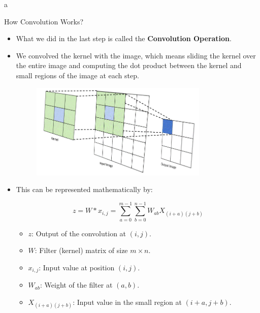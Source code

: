 a\documentclass[10pt]{beamer}
\theoremstyle{remark}
\theoremstyle{definition}
\begin{document}
\begin{frame}[allowframebreaks]{How Convolution Works?}
\begin{itemize}
    \item What we did in the last step is called the \textbf{Convolution Operation}.
    \item We convolved the kernel with the image, which means sliding the kernel over the entire image and computing the dot product between the kernel and small regions of the image at each step.
    \begin{figure}
\centering
\includegraphics[width=0.8\textwidth,height=0.8\textheight,keepaspectratio]{./images/convolve.png}
\end{figure}

\end{itemize}



\framebreak

\begin{itemize}
    \item This can be represented mathematically by:
    
    \[
    z = W * x_{i,j} = \sum_{a=0}^{m-1} \sum_{b=0}^{n-1} W_{ab} X_{(i+a)(j+b)}
    \]
    \begin{itemize}
    \item $z$: Output of the convolution at $(i, j)$.
    \item $W$: Filter (kernel) matrix of size $m \times n$.
    \item $x_{i,j}$: Input value at position $(i, j)$.
    \item $W_{ab}$: Weight of the filter at $(a, b)$.
    \item $X_{(i+a)(j+b)}$: Input value in the small region at $(i+a, j+b)$.
    \end{itemize}

\end{itemize}



\framebreak


\end{frame}
\end{document}
